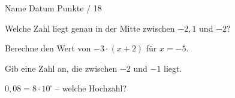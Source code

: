 \documentclass[11pt]{article}
\begin{document}
{}
\par\vspace{2pt}\noindent Name \underline{\hspace{7cm}}\hfill Datum \underline{\hspace{3cm}}\hfill Punkte \underline{\hspace{1.2cm}} / 18\par\vspace{6pt}
\small

\noindent\begin{minipage}[t]{0.485\linewidth}\raggedright
\begin{aufgabe}{Welche Zahl liegt genau in der Mitte zwischen $-2{,}1$ und $-2$? \leerfeld}
\end{aufgabe}
\end{minipage}\hfill\begin{minipage}[t]{0.485\linewidth}\raggedright
\begin{aufgabe}{Berechne den Wert von $-3 \cdot (x + 2)$ für $x = -5$. \leerfeld}
\end{aufgabe}
\end{minipage}\par

\noindent\begin{minipage}[t]{0.485\linewidth}\raggedright
\begin{aufgabe}{Gib eine Zahl an, die zwischen $-2$ und $-1$ liegt. \leerfeld}
\end{aufgabe}
\end{minipage}\hfill\begin{minipage}[t]{0.485\linewidth}\raggedright
\begin{aufgabe}{$0{,}08 = 8 \cdot 10^{\square}$ – welche Hochzahl? \leerfeld}
\end{aufgabe}
\end{minipage}\par
\end{document}
